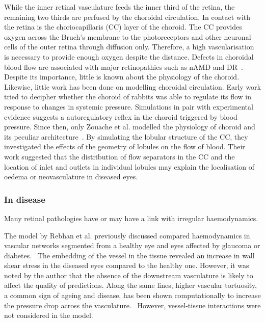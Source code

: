 \documentclass[12pt,a4paper]{journal}
\begin{document}
While the inner retinal vasculature feeds the inner third of the retina, the remaining two thirds are perfused by the choroidal circulation.
In contact with the retina is the choriocapillaris (CC) layer of the choroid.
The CC provides oxygen across the Bruch's membrane to the photoreceptors and other neuronal cells of the outer retina through diffusion only.
Therefore, a high vascularisation is necessary to provide enough oxygen despite the distance.
Defects in choroidal blood flow are associated with major retinopathies such as nAMD and DR~\cite{Pemp_2008}.
Despite its importance, little is known about the physiology of the choroid.
Likewise, little work has been done on modelling choroidal circulation.
Early work tried to decipher whether the choroid of rabbits was able to regulate its flow in response to changes in systemic pressure.\cite{Kiel_1992}
Simulations in pair with experimental evidence suggests a autoregulatory reflex in the choroid triggered by blood pressure.
Since then, only Zouache et al. modelled the physiology of choroid and its peculiar architecture~\cite{Zouache_2015}.
By simulating the lobular structure of the CC, they investigated the effects of the geometry of lobules on the flow of blood.
Their work suggested that the distribution of flow separators in the CC and the location of inlet and outlets in individual lobules may explain the localisation of oedema or neovasculature in diseased eyes.\cite{Zouache_2015}



\subsubsection*{In disease}

Many retinal pathologies have or may have a link with irregular haemodynamics.

The model by Rebhan et al. previously discussed compared haemodynamics in vascular networks segmented from a healthy eye and eyes affected by glaucoma or diabetes.~\cite{Rebhan_2019}
The embedding of the vessel in the tissue revealed an increase in wall shear stress in the diseased eyes compared to the healthy one.
However, it was noted by the author that the absence of the downstream vasculature is likely to affect the quality of predictions.\cite{Rebhan_2019}
Along the same lines, higher vascular tortuosity, a common sign of ageing and disease, has been shown computationally to increase the pressure drop across the vasculature.~\cite{Malek_2014}
However, vessel-tissue interactions were not considered in the model.
\end{document}
